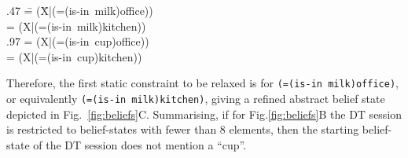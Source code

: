 \small
\begin{tabtt}
.47 \= = \entropy(\=X|(=(is-in~milk)office))\+ \\
 = \entropy(X|(=(is-in~milk)kitchen)) \-\\
.97 = \entropy(X|(=(is-in~cup)office))\+\\
 = \entropy(X|(=(is-in~cup)kitchen))
\end{tabtt}
\normalsize

\noindent Therefore, the first static constraint to be relaxed is for
\texttt{(=(is-in~milk)office)}, or
equivalently \texttt{(=(is-in~milk)kitchen)}, giving a refined
abstract belief state depicted in
Fig.~\ref{fig:beliefs}C. Summarising, if for Fig.\ref{fig:beliefs}B
the DT session is restricted to belief-states with fewer than $8$
elements, then the starting belief-state of the DT session does not
mention a ``cup''.



